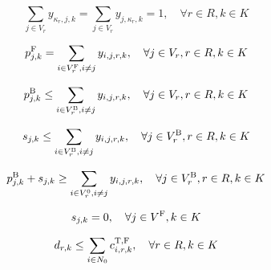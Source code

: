 \begin{linenomath}
    \begin{equation}
        \sum_{j \in V_r} y_{\kappa_r,j,k} = \sum_{j \in V_r} y_{j,\kappa_r,k} = 1, \quad \forall r \in R, k \in K \label{eq:laborer_tour}
    \end{equation}
\end{linenomath}

\begin{linenomath}
    \begin{equation}
        p^{\text{F}}_{j,k} = \sum_{i \in V^{\text{F}}_r, i \neq j} y_{i,j,r,k}, \quad \forall j \in V_r, r \in R, k \in K \label{eq:pickup_visit_functional}
    \end{equation}
\end{linenomath}

\begin{linenomath}
    \begin{equation}
        p^{\text{B}}_{j,k} \leq \sum_{i \in V^{\text{B}}_r, i \neq j} y_{i,j,r,k}, \quad \forall j \in V_r, r \in R, k \in K \label{eq:pickup_visit_broken}
    \end{equation}
\end{linenomath}

\begin{linenomath}
    \begin{equation}
        s_{j,k} \leq \sum_{i \in V^{\text{B}}_r, i \neq j} y_{i,j,r,k}, \quad \forall j \in V_r^{\text{B}}, r \in R, k \in K \label{eq:repair_visit}
    \end{equation}
\end{linenomath}

\begin{linenomath}
    \begin{equation}
        p^{\text{B}}_{j,k} + s_{j,k} \geq \sum_{i \in V^0_r, i \neq j} y_{i,j,r,k}, \quad \forall j \in V^{\text{B}}_r, r \in R, k \in K \label{eq:visit_action}
    \end{equation}
\end{linenomath}

\begin{linenomath}
    \begin{equation}
        s_{j,k} = 0, \quad \forall j \in V^{\text{F}}, k \in K \label{eq:functional_no_repair}
    \end{equation}
\end{linenomath}

\begin{linenomath}
    \begin{equation}
        d_{r,k} \leq \sum_{i \in N_0} c^{\text{\text{T},\text{F}}}_{i,r,k}, \quad \forall r \in R, k \in K \label{eq:functional_balance}
    \end{equation}
\end{linenomath}

